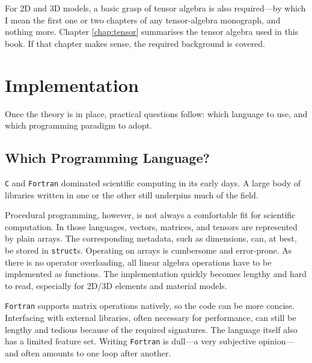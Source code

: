 For 2D and 3D models, a basic grasp of tensor algebra is also required---by which I mean the first one or two chapters of any tensor-algebra monograph, and nothing more.
Chapter \ref{chap:tensor} summarises the tensor algebra used in this book.
If that chapter makes sense, the required background is covered.
\section{Implementation}
Once the theory is in place, practical questions follow: which language to use, and which programming paradigm to adopt.
\subsection{Which Programming Language?}
\texttt{C} and \texttt{Fortran} dominated scientific computing in its early days.
A large body of libraries written in one or the other still underpins much of the field.

Procedural programming, however, is not always a comfortable fit for scientific computation.
In those languages, vectors, matrices, and tensors are represented by plain arrays.
The corresponding metadata, such as dimensions, can, at best, be stored in \texttt{struct}s.
Operating on arrays is cumbersome and error-prone.
As there is no operator overloading, all linear algebra operations have to be implemented as functions.
The implementation quickly becomes lengthy and hard to read, especially for 2D/3D elements and material models.

\texttt{Fortran} supports matrix operations natively, so the code can be more concise.
Interfacing with external libraries, often necessary for performance, can still be lengthy and tedious because of the required signatures.
The language itself also has a limited feature set.
Writing \texttt{Fortran} is dull---a very subjective opinion---and often amounts to one loop after another.

